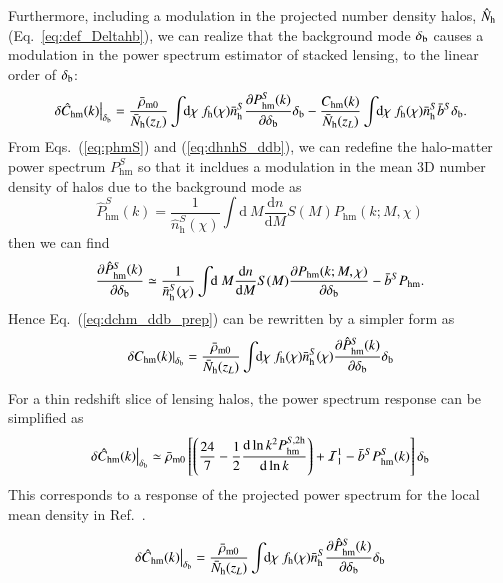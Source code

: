 \documentclass[onecolumn,notitlepage,showpacs,amsmath,amssymb,prd,floatfix]{revtex4-1}
\newcommand{\dr}{\mathrm{d}}
\newcommand{\deltab}{\delta_{\rm b}}
\newcommand{\phm}{P_{\mathrm{hm}}}
\newcommand{\hphm}{\hat{P}_{\mathrm{hm}}}
\newcommand{\chm}{C_{\mathrm{hm}}}
\newcommand{\hchm}{\hat{C}_{\mathrm{hm}}}
\newcommand{\bnh}{\frac{\dr n}{\dr M}}
\newcommand{\bnhs}{\bar{n}_{\rm h}^S}
\newcommand{\hNh}{\hat{N}_{\rm h}}
\newcommand{\bNh}{\bar{N}_{\rm h}}
\newcommand{\hnh}{\hat{n}_{\mathrm{h}}}
\begin{document}
Furthermore, including a modulation in the projected number density
halos, $\hNh$ (Eq.~\ref{eq:def_Deltahb}), we can realize that the
background mode $\deltab$ causes a modulation in the power spectrum
estimator of stacked lensing, to the linear order of $\deltab$:
%
\begin{equation}
 \left.\delta\hchm(k)\right|_{\deltab}=
  \frac{\bar{\rho}_{\rm m0}}{\bNh(z_L)}\int\!\!\dr\chi~f_{\rm h}(\chi)\bnhs
  \frac{\partial \phm^S(k)}{\partial
  \deltab}\deltab-\frac{\chm(k)}{\bNh(z_L)}\int\!\!\dr\chi~f_{\rm h}(\chi)\bnhs\bar{b}^S\deltab.
\label{eq:dchm_ddb_prep}
\end{equation}
%
From Eqs.~(\ref{eq:phmS}) and (\ref{eq:dhnhS_ddb}), we can redefine the
halo-matter power spectrum $\phm^S$ so that it incldues a modulation in
the mean 3D number density of halos due to the background mode as
%
\begin{equation}
 \hphm^S(k)=\frac{1}{\hnh^S(\chi)}\int\!\!\dr~M \bnh S(M)\phm(k;M,\chi)
\end{equation}
%
then we can find
%
\begin{equation}
 \frac{\partial \hphm^S(k)}{\partial \deltab}\simeq
  \frac{1}{\bnhs(\chi)}\int\!\!\dr~M \bnh S(M)
  \frac{\partial \phm(k;M,\chi)}{\partial \deltab}-\bar{b}^S \phm. 
\end{equation}
%
Hence Eq.~(\ref{eq:dchm_ddb_prep}) can be rewritten by a simpler form as
%
\begin{equation}
 \left.\delta \chm(k)\right|_{\deltab}=\frac{\bar{\rho}_{\rm
  m0}}{\bNh(z_L)}
  \int\!\!\dr\chi~f_{\rm h}(\chi)\bnhs(\chi)\frac{\partial
  \hphm^S(k)}{\partial \deltab}\deltab
\end{equation}


For a thin redshift slice of lensing halos, the power spectrum response
can be simplified as
%
\begin{equation}
 \left.\delta\hchm(k)\right|_{\deltab}\simeq \bar{\rho}_{\rm m0}
  \left[\left(\frac{24}{7}-\frac{1}{2}\frac{\dr\ln k^2\phm^{S,{\rm
	 2h}}}{\dr \ln k}\right)+{\cal I}^1_1-\bar{b}^S\phm^S(k)\right]\deltab
\end{equation}
%
This corresponds to a response of the projected power spectrum for the
local mean density in Ref.~\cite{TakadaHu:13}.

\begin{equation}
 \left.\delta\hchm(k)\right|_{\deltab}=\frac{\bar{\rho}_{\rm m0}}{\bNh(z_L)}
  \int\!\!\dr\chi~f_{\rm h}(\chi)\bnhs
\frac{\partial \hphm^S(k)}{\partial \deltab}\deltab
\end{equation}
\end{document}
